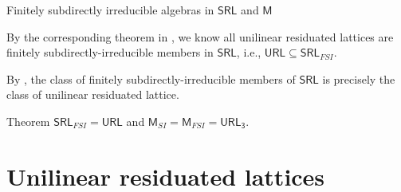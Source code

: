 \documentclass[professionalfont, handout, 12pt]{beamer} %
\theoremstyle{plain}
\theoremstyle{definition}
\begin{document}
\begin{frame}{Finitely subdirectly irreducible algebras in $\mathsf{SRL}$ and $\mathsf{M}$}

By the corresponding theorem in \cite{galatos2007residuated}, we know all unilinear residuated lattices are finitely subdirectly-irreducible members in $\mathsf{SRL}$, i.e., $\mathsf{URL} \subseteq \mathsf{SRL}_{FSI}$.\pause
\medskip

By \cite{galatos2004equational}, the class of finitely subdirectly-irreducible members of $\mathsf{SRL}$ is precisely the class of unilinear residuated lattice.
\medskip

\begin{block}{Theorem}\label{t: FSI}
$\mathsf{SRL}_{FSI} = \mathsf{URL}$ and $\mathsf{M}_{SI} = \mathsf{M}_{FSI} = \mathsf{URL_3}$.
\end{block}
\end{frame}

\section{Unilinear residuated lattices}
\end{document}
